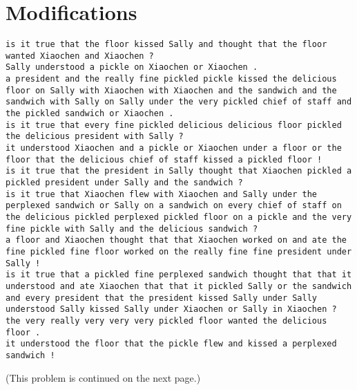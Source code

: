 \documentclass[11pt]{article}
\begin{document}
\newpage

\section{Modifications}

\begin{lstlisting}
is it true that the floor kissed Sally and thought that the floor wanted Xiaochen and Xiaochen ?
Sally understood a pickle on Xiaochen or Xiaochen .
a president and the really fine pickled pickle kissed the delicious floor on Sally with Xiaochen with Xiaochen and the sandwich and the sandwich with Sally on Sally under the very pickled chief of staff and the pickled sandwich or Xiaochen .
is it true that every fine pickled delicious delicious floor pickled the delicious president with Sally ?
it understood Xiaochen and a pickle or Xiaochen under a floor or the floor that the delicious chief of staff kissed a pickled floor !
is it true that the president in Sally thought that Xiaochen pickled a pickled president under Sally and the sandwich ?
is it true that Xiaochen flew with Xiaochen and Sally under the perplexed sandwich or Sally on a sandwich on every chief of staff on the delicious pickled perplexed pickled floor on a pickle and the very fine pickle with Sally and the delicious sandwich ?
a floor and Xiaochen thought that that Xiaochen worked on and ate the fine pickled fine floor worked on the really fine fine president under Sally !
is it true that a pickled fine perplexed sandwich thought that that it understood and ate Xiaochen that that it pickled Sally or the sandwich and every president that the president kissed Sally under Sally understood Sally kissed Sally under Xiaochen or Sally in Xiaochen ?
the very really very very very pickled floor wanted the delicious floor .
it understood the floor that the pickle flew and kissed a perplexed sandwich !
\end{lstlisting}
(This problem is continued on the next page.)

\newpage
\end{document}
